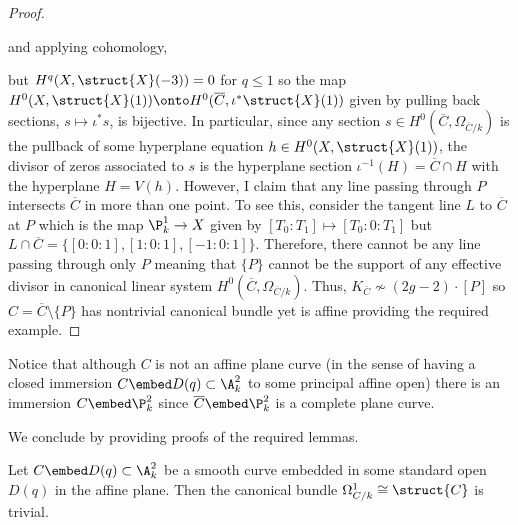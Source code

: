 \begin{proof}
\begin{center}
\end{center}
and applying cohomology,
\begin{center}
\end{center}
but $H^q(X, \struct{X}(-3)) = 0$ for $q \le 1$ so the map $H^0(X, \struct{X}(1)) \onto H^0(\overline{C}, \iota^* \struct{X}(1))$ given by pulling back sections, $s \mapsto \iota^* s$, is bijective. In particular, since any section $s \in H^0(\overline{C}, \Omega_{\overline{C}/k})$ is the pullback of some hyperplane equation $h \in H^0(X, \struct{X}(1))$, the divisor of zeros associated to $s$ is the hyperplane section $\iota^{-1}(H) = \overline{C} \cap H$ with the hyperplane $H = V(h)$. However, I claim that any line passing through $P$ intersects $\overline{C}$ in more than one point. To see this, consider the tangent line $L$ to $\overline{C}$ at $P$ which is the map $\P^1_k \to X$ given by $[T_0 : T_1] \mapsto [T_0 : 0 : T_1]$ but $L \cap \overline{C} = \{[0 : 0 : 1], [1 : 0 : 1], [-1 : 0 : 1] \}$. Therefore, there cannot be any line passing through only $P$ meaning that $\{ P \}$ cannot be the support of any effective divisor in canonical linear system $H^0(\overline{C}, \Omega_{\overline{C}/k})$. Thus, $K_{\overline{C}} \not\sim (2g - 2) \cdot [P]$ so $C = \overline{C} \setminus \{ P \}$ has nontrivial canonical bundle yet is affine providing the required example.
\end{proof}

\begin{rmk}
Notice that although $C$ is not an affine plane curve (in the sense of having a closed immersion $C \embed D(q) \subset \A^2_k$ to some principal affine open) there is an immersion $C \embed \P^2_k$ since $\overline{C} \embed \P^2_k$ is a complete plane curve.
\end{rmk}
\noindent
We conclude by providing proofs of the required lemmas.

\begin{lemma} \label{plane_curve_trivial_canonical}
Let $C \embed D(q) \subset \A^2_k$ be a smooth curve embedded in some standard open $D(q)$ in the affine plane. Then the canonical bundle $\Omega^1_{C/k} \cong \struct{C}$ is trivial.
\end{lemma}

